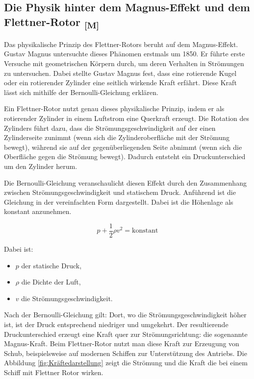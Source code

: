 \documentclass[a4paper,12pt]{article}
\begin{document}
\subsection{\texorpdfstring{Die Physik hinter dem Magnus-Effekt und dem Flettner-Rotor \textsubscript{[M]}}{Die Physik hinter dem Magnus-Effekt und dem Flettner-Rotor [M]}}
\label{sec:Die Physik hinter dem Magnus-Effekt und dem Flettner-Rotor}
Das physikalische Prinzip des Flettner-Rotors beruht auf dem Magnus-Effekt. Gustav Magnus untersuchte dieses Phänomen erstmals um 1850. Er führte erste Versuche mit geometrischen Körpern durch, um deren Verhalten in Strömungen zu untersuchen. Dabei stellte Gustav Magnus fest, dass eine rotierende Kugel oder ein rotierender Zylinder eine seitlich wirkende Kraft erfährt. Diese Kraft lässt sich mithilfe der Bernoulli-Gleichung erklären.\cite{Flettner_Uni_Flensburg}\newline

Ein Flettner-Rotor nutzt genau dieses physikalische Prinzip, indem er als rotierender Zylinder in einem Luftstrom eine Querkraft erzeugt. Die Rotation des Zylinders führt dazu, dass die Strömungsgeschwindigkeit auf der einen Zylinderseite zunimmt (wenn sich die Zylinderoberfläche mit der Strömung bewegt), während sie auf der gegenüberliegenden Seite abnimmt (wenn sich die Oberfläche gegen die Strömung bewegt). Dadurch entsteht ein Druckunterschied um den Zylinder herum.

Die Bernoulli-Gleichung veranschaulicht diesen Effekt durch den Zusammenhang zwischen Strömungsgeschwindigkeit und statischem Druck. Anführend ist die Gleichung in der vereinfachten Form dargestellt. Dabei ist die Höhenlage als konstant anzunehmen.

\begin{equation}
p + \frac{1}{2} \rho v^2 = \text{konstant}
\end{equation}

Dabei ist:
\begin{itemize}
    \item $p$ der statische Druck,
    \item $\rho$ die Dichte der Luft,
    \item $v$ die Strömungsgeschwindigkeit.
\end{itemize}

Nach der Bernoulli-Gleichung gilt: Dort, wo die Strömungsgeschwindigkeit höher ist, ist der Druck entsprechend niedriger und umgekehrt. Der resultierende Druckunterschied erzeugt eine Kraft quer zur Strömungsrichtung: die sogenannte Magnus-Kraft.
Beim Flettner-Rotor nutzt man diese Kraft zur Erzeugung von Schub, beispielsweise auf modernen Schiffen zur Unterstützung des Antriebs.
Die Abbildung \ref{fig:Kräftedarstellung} zeigt die Strömung und die Kraft die bei einem Schiff mit Flettner Rotor wirken.\cite{Flettner_Rotor_Wiki}
\end{document}
